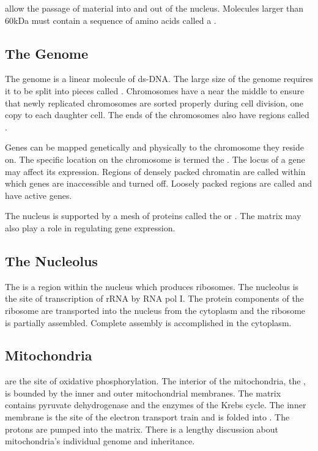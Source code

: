 \documentclass[../Bio_chemistryReview.tex]{subfiles}
\begin{document}
 allow the passage of material into and out of the
nucleus. Molecules larger than 60kDa must contain a sequence of amino acids
called a .

\subsection{The Genome}
The genome is a linear molecule of ds-DNA. The large size of the genome requires
it to be split into pieces called . Chromosomes have a
 near the middle to ensure that newly replicated chromosomes
are sorted properly during cell division, one copy to each daughter cell. The
ends of the chromosomes also have regions called .\par

Genes can be mapped genetically and physically to the chromosome they reside on.
The specific location on the chromosome is termed the . The locus
of a gene may affect its expression. Regions of densely packed chromatin are
called  within which genes are inaccessible and turned
off. Loosely packed regions are called  and have active
genes.\par

The nucleus is supported by a mesh of proteins called the  or . The matrix may also play a role in
regulating gene expression.

\subsection{The Nucleolus}
The  is a region within the nucleus which produces ribosomes.
The nucleolus is the site of transcription of rRNA by RNA pol I. The protein
components of the ribosome are transported into the nucleus from the cytoplasm
and the ribosome is partially assembled. Complete assembly is accomplished in
the cytoplasm.

\subsection{Mitochondria}
 are the site of oxidative phosphorylation. The interior
of the mitochondria, the , is bounded by the inner and outer
mitochondrial membranes. The matrix contains pyruvate dehydrogenase and the
enzymes of the Krebs cycle. The inner membrane is the site of the electron
transport train and is folded into . The protons are pumped
into the matrix. There is a lengthy discussion about mitochondria's individual
genome and inheritance.
\end{document}
